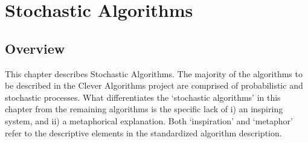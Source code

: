 

\chapter{Stochastic Algorithms}
\label{ch:stochastic}


% 
% 
\section{Overview}
This chapter describes Stochastic Algorithms.
The majority of the algorithms to be described in the Clever Algorithms project are comprised of probabilistic and stochastic processes. What differentiates the `stochastic algorithms' in this chapter from the remaining algorithms is the specific lack of i) an inspiring system, and ii) a metaphorical explanation. Both `inspiration' and `metaphor' refer to the descriptive elements in the standardized algorithm description.


